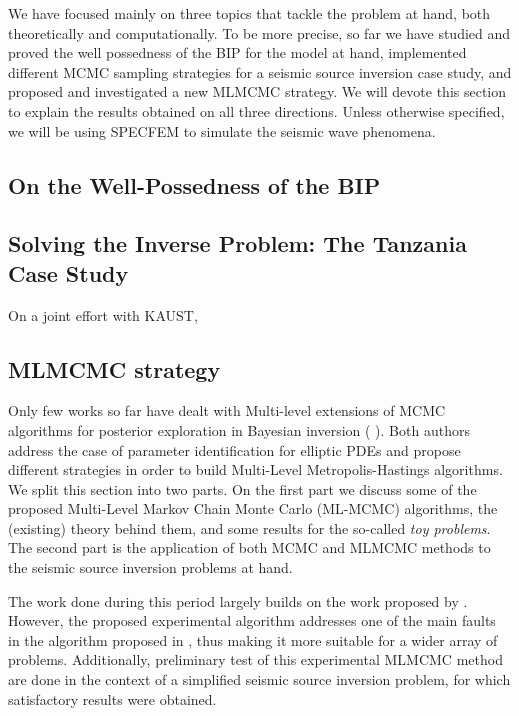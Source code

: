 We have focused mainly on three topics that tackle the problem at hand, both theoretically and computationally. To be more precise, so far we have studied and proved the well possedness of the BIP for the model at hand, implemented different MCMC sampling strategies for a seismic source inversion case study, and proposed and investigated a new MLMCMC strategy. We will devote this section to explain the results obtained on all three directions. Unless otherwise specified, we will be using SPECFEM to simulate the seismic wave phenomena.
\subsection{On the Well-Possedness of the BIP}


\subsection{Solving the Inverse Problem: The Tanzania Case Study}
On a joint effort with KAUST, 


\subsection{MLMCMC strategy}






\hspace*{0.3cm}
Only few works so far have dealt with Multi-level extensions of MCMC algorithms for posterior exploration in Bayesian inversion (\cite{hoang2013complexity} \cite{dodwell2015hierarchical}). Both authors address the case of parameter identification for elliptic PDEs and propose different strategies in order to build Multi-Level Metropolis-Hastings algorithms. 
We split this section into two parts. On the first part we discuss some of the proposed Multi-Level Markov Chain Monte Carlo (ML-MCMC) algorithms, the (existing) theory behind them, and some results for the so-called \textit{toy problems}. The second part is the application of both MCMC and MLMCMC methods to the seismic source inversion problems at hand.



The work done during this period largely builds on the work proposed by \cite{dodwell2015hierarchical}. However, the proposed experimental algorithm addresses one of the main faults in the algorithm proposed in \cite{dodwell2015hierarchical}, thus making it more suitable for a wider array of problems. Additionally, preliminary test of this experimental  MLMCMC method are done in the context of a simplified seismic source inversion problem, for which satisfactory results were obtained.

